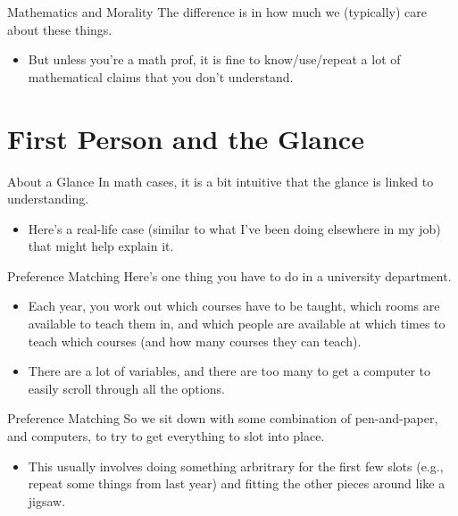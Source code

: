 \documentclass[
  17pt,
  letterpaper,
  ignorenonframetext,
  aspectratio=169,
  handout]{beamer}
\providecommand{\tightlist}{%
  \setlength{\itemsep}{0pt}\setlength{\parskip}{0pt}}\usepackage{longtable,booktabs,array}
\begin{document}
\begin{frame}{Mathematics and Morality}
\protect\hypertarget{mathematics-and-morality-3}{}
The difference is in how much we (typically) care about these things.

\begin{itemize}[<+->]
\tightlist
\item
  But unless you're a math prof, it is fine to know/use/repeat a lot of
  mathematical claims that you don't understand.
\end{itemize}
\end{frame}

\hypertarget{first-person-and-the-glance}{%
\section{First Person and the
Glance}\label{first-person-and-the-glance}}

\begin{frame}{About a Glance}
\protect\hypertarget{about-a-glance}{}
In math cases, it is a bit intuitive that the glance is linked to
understanding.

\begin{itemize}[<+->]
\tightlist
\item
  Here's a real-life case (similar to what I've been doing elsewhere in
  my job) that might help explain it.
\end{itemize}
\end{frame}

\begin{frame}{Preference Matching}
\protect\hypertarget{preference-matching}{}
Here's one thing you have to do in a university department.

\begin{itemize}[<+->]
\tightlist
\item
  Each year, you work out which courses have to be taught, which rooms
  are available to teach them in, and which people are available at
  which times to teach which courses (and how many courses they can
  teach).
\item
  There are a lot of variables, and there are too many to get a computer
  to easily scroll through all the options.
\end{itemize}
\end{frame}

\begin{frame}{Preference Matching}
\protect\hypertarget{preference-matching-1}{}
So we sit down with some combination of pen-and-paper, and computers, to
try to get everything to slot into place.

\begin{itemize}[<+->]
\tightlist
\item
  This usually involves doing something arbritrary for the first few
  slots (e.g., repeat some things from last year) and fitting the other
  pieces around like a jigsaw.
\end{itemize}
\end{frame}
\end{document}
